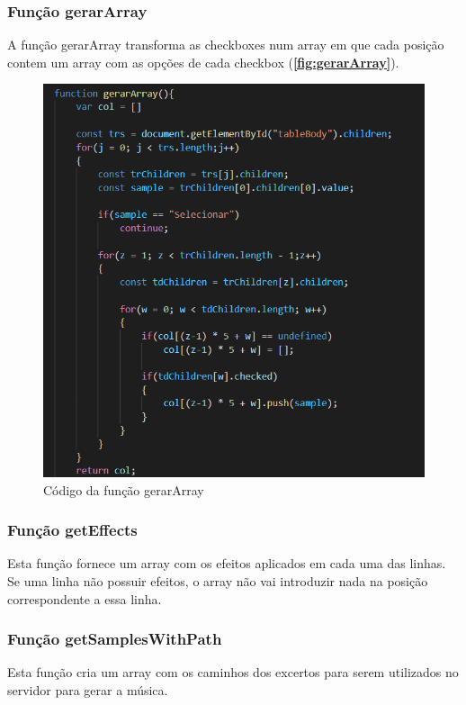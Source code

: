 \documentclass{report}
\begin{document}
\subsubsection{Função gerarArray}
\label{ssec:gerarArray}
\hspace{5pt} A função gerarArray transforma as checkboxes num array em que cada posição contem um array com 
as opções de cada checkbox (\textbf{\autoref{fig:gerarArray}}). \cite{checkboxes}

\begin{figure}[!h]
\center 
\includegraphics[width=330pt]{img/Funcao_gerarArray.png}
\caption{Código da função gerarArray}
\label{fig:gerarArray}
\end{figure}

\subsubsection{Função getEffects}
\label{ssec:getEffects}
\hspace{5pt}Esta função fornece um array com os efeitos aplicados em cada uma das linhas. Se uma linha não 
possuir efeitos, o array não vai introduzir nada na posição correspondente a essa linha.

\subsubsection{Função getSamplesWithPath}
\label{ssec:getSamplesWithPath}
\hspace{5pt}Esta função cria um array com os caminhos dos excertos para serem utilizados no servidor para 
gerar a música.
\end{document}
